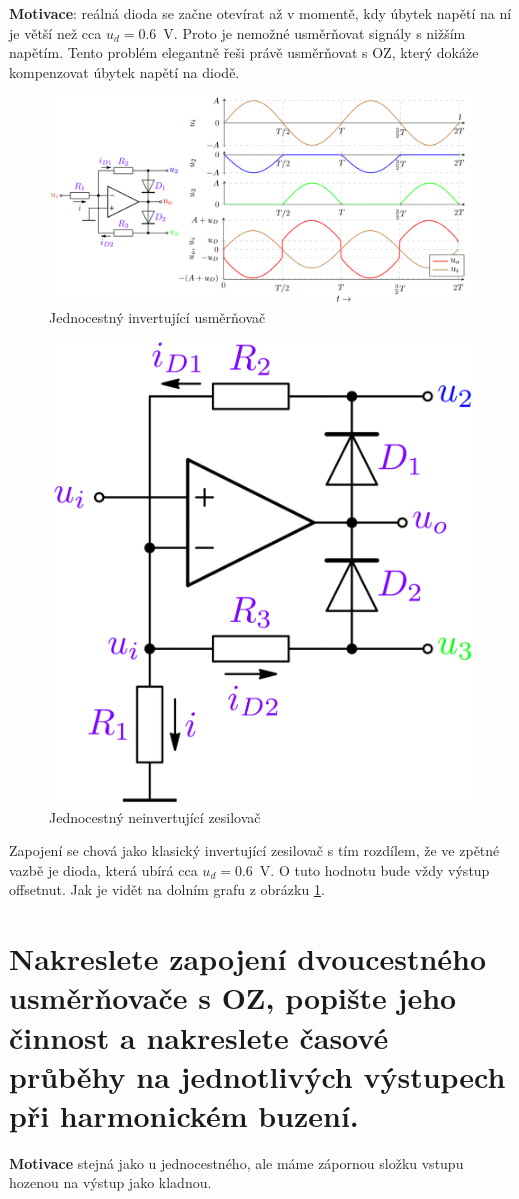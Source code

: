 \documentclass[a4paper,12pt]{article}   %
\begin{document}
\textbf{Motivace}: reálná dioda se začne otevírat až v momentě, kdy úbytek napětí na ní je větší než cca $u_d = 0.6$~V. Proto je nemožné usměrňovat signály s nižším napětím. Tento problém elegantně řeši právě usměrňovat s OZ, který dokáže kompenzovat úbytek napětí na diodě.

\begin{figure}
    \centering
    \includegraphics[width=\textwidth]{jednocestny-usmernovac.PNG}
    \caption{Jednocestný invertující usměrňovač}
    \label{fig:jednocestny:usmernovac}
\end{figure}
\begin{figure}
    \centering
    \includegraphics[width = .4\textwidth]{jednocestny-usmernovac-noninvert.PNG}
    \caption{Jednocestný neinvertující zesilovač}
    \label{fig:jendocestny:usmernovat:noninvert}
\end{figure}

Zapojení se chová jako klasický invertující zesilovač s tím rozdílem, že ve zpětné vazbě je dioda, která ubírá cca $u_d = 0.6$~V. O tuto hodnotu bude vždy výstup offsetnut. Jak je vidět na dolním grafu z obrázku \ref{fig:jednocestny:usmernovac}.








\section{Nakreslete zapojení dvoucestného usměrňovače s OZ, popište jeho činnost a nakreslete časové průběhy na jednotlivých výstupech při harmonickém buzení.}
\textbf{Motivace} stejná jako u jednocestného, ale máme zápornou složku vstupu hozenou na výstup jako kladnou.
\end{document}
